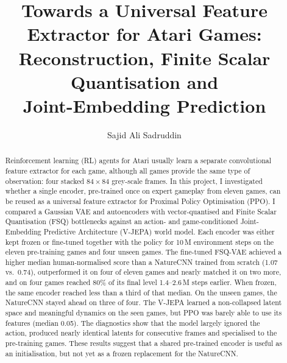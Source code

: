 \documentclass[runningheads]{llncs}
\begin{document}
\title{Towards a Universal Feature Extractor for Atari Games:\\
Reconstruction, Finite Scalar Quantisation and\\ Joint-Embedding Prediction}

\author{Sajid Ali Sadruddin}

\maketitle

\begin{abstract}
Reinforcement learning (RL) agents for Atari usually learn a separate convolutional feature
extractor for each game, although all games provide the same type of observation: four
stacked $84\times84$ grey-scale frames. In this project, I investigated whether a single
encoder, pre-trained once on expert gameplay from eleven games, can be reused as a universal
feature extractor for Proximal Policy Optimisation (PPO). I compared a Gaussian VAE and
autoencoders with vector-quantised and Finite Scalar Quantisation (FSQ) bottlenecks against an
action- and game-conditioned Joint-Embedding Predictive Architecture (V-JEPA) world model. Each
encoder was either kept frozen or fine-tuned together with the policy for 10\,M environment
steps on the eleven pre-training games and four unseen games. The fine-tuned FSQ-VAE achieved a
higher median human-normalised score than a NatureCNN trained from scratch (1.07 vs.\ 0.74),
outperformed it on four of eleven games and nearly matched it on two more, and on four games
reached 80\% of its final level 1.4--2.6\,M steps earlier. When frozen, the same encoder
reached less than a third of that median. On the unseen games, the NatureCNN stayed ahead on
three of four. The V-JEPA
learned a non-collapsed latent space and meaningful dynamics on the seen games, but PPO was
barely able to use its features (median 0.05). The diagnostics show that the model largely
ignored the action, produced nearly identical latents for consecutive frames and specialised
to the pre-training games. These results suggest that a shared pre-trained encoder is useful
as an initialisation, but not yet as a frozen replacement for the NatureCNN.
\end{abstract}

\end{document}
